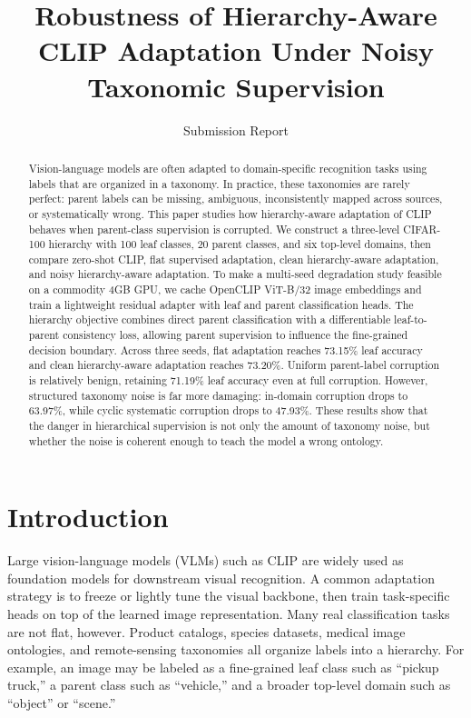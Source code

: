 \documentclass[runningheads]{llncs}
\begin{document}
\title{Robustness of Hierarchy-Aware CLIP Adaptation Under Noisy Taxonomic Supervision}

\author{Submission Report}

\maketitle

\begin{abstract}
Vision-language models are often adapted to domain-specific recognition tasks
using labels that are organized in a taxonomy. In practice, these taxonomies
are rarely perfect: parent labels can be missing, ambiguous, inconsistently
mapped across sources, or systematically wrong. This paper studies how
hierarchy-aware adaptation of CLIP behaves when parent-class supervision is
corrupted. We construct a three-level CIFAR-100 hierarchy with 100 leaf
classes, 20 parent classes, and six top-level domains, then compare zero-shot
CLIP, flat supervised adaptation, clean hierarchy-aware adaptation, and noisy
hierarchy-aware adaptation. To make a multi-seed degradation study feasible on
a commodity 4GB GPU, we cache OpenCLIP ViT-B/32 image embeddings and train a
lightweight residual adapter with leaf and parent classification heads. The
hierarchy objective combines direct parent classification with a differentiable
leaf-to-parent consistency loss, allowing parent supervision to influence the
fine-grained decision boundary. Across three seeds, flat adaptation reaches
73.15\% leaf accuracy and clean hierarchy-aware adaptation reaches 73.20\%.
Uniform parent-label corruption is relatively benign, retaining 71.19\% leaf
accuracy even at full corruption. However, structured taxonomy noise is far
more damaging: in-domain corruption drops to 63.97\%, while cyclic systematic
corruption drops to 47.93\%. These results show that the danger in hierarchical
supervision is not only the amount of taxonomy noise, but whether the noise is
coherent enough to teach the model a wrong ontology.

\end{abstract}

\section{Introduction}
Large vision-language models (VLMs) such as CLIP are widely used as foundation
models for downstream visual recognition. A common adaptation strategy is to
freeze or lightly tune the visual backbone, then train task-specific heads on
top of the learned image representation. Many real classification tasks are
not flat, however. Product catalogs, species datasets, medical image
ontologies, and remote-sensing taxonomies all organize labels into a hierarchy.
For example, an image may be labeled as a fine-grained leaf class such as
``pickup truck,'' a parent class such as ``vehicle,'' and a broader top-level
domain such as ``object'' or ``scene.''
\end{document}
